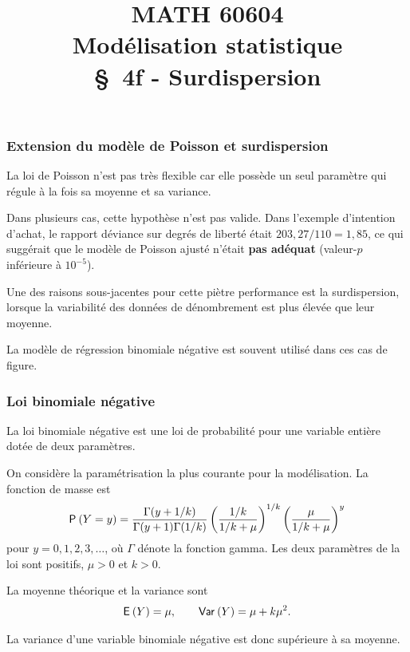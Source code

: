 \documentclass{beamer}
\title[\color{white}{MATH 60604 \S~4f - Surdispersion}]{\texorpdfstring{MATH 60604 \\Modélisation statistique \\ \S~4f - Surdispersion}{MATH 60604 \\Modélisation statistique \\ \S~4f - Surdispersion}}
\author{}
\institute{HEC Montréal\\
Département de sciences de la décision}
\date{}
\begin{document}
\frame{\titlepage}

\begin{frame}[fragile]
\frametitle{Extension du modèle de Poisson et surdispersion}
\bi
\item La loi de Poisson n'est pas très flexible car elle possède un seul paramètre qui régule à la fois sa moyenne et sa variance.
\item Dans plusieurs cas, cette hypothèse n'est pas valide. Dans l'exemple d'intention d'achat, le rapport déviance sur degrés de liberté était  $203,27/110 = 1,85$, ce qui suggérait que le modèle de Poisson ajusté n'était \textbf{pas adéquat} (valeur-$p$ inférieure à $10^{-5}$).
\item Une des raisons sous-jacentes pour cette piètre performance est la surdispersion, lorsque la variabilité des données de dénombrement est plus élevée que leur moyenne.
\item La modèle de régression \alert{binomiale négative} est souvent utilisé dans ces cas de figure.
\ei
\end{frame}


\begin{frame}[fragile]
\frametitle{Loi binomiale négative}
\bi
\item La loi  binomiale négative est une loi de probabilité pour une variable  \alert{entière} dotée de deux paramètres.
\item On considère la paramétrisation la plus courante pour la modélisation. La fonction de masse est
\begin{align*}
\P{Y=y}=\frac{\Gamma(y+1/k)}{\Gamma(y+1)\Gamma(1/k)} \left(\frac{1/k}{1/k + \mu} \right)^{1/k} \left(\frac{\mu}{1/k+\mu}\right)^y
\end{align*}
pour $y=0, 1, 2, 3, \ldots$, où $\Gamma$ dénote la fonction gamma. Les deux paramètres de la loi sont positifs, $\mu>0$ et $k>0$.

\item La moyenne théorique et la variance sont \begin{align*}
\E{Y}=\mu, \qquad \Va{Y}=\mu+k\mu^2.                                 \end{align*}
\item La variance d'une variable binomiale négative est donc \alert{supérieure} à sa moyenne. 
\ei
\end{frame}
\end{document}
